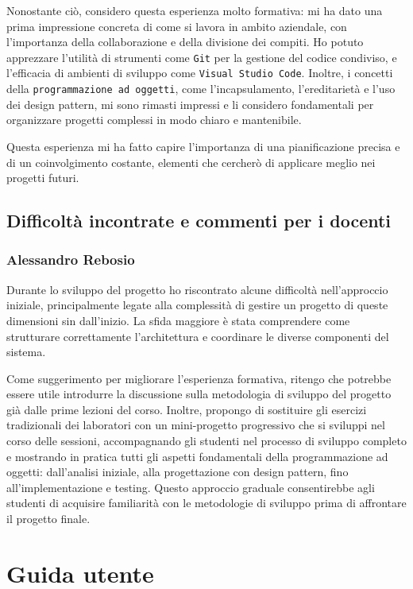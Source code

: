 \documentclass[a4paper,12pt]{report}
\begin{document}
Nonostante ciò, considero questa esperienza molto formativa: mi ha dato una prima impressione concreta di come si lavora in ambito aziendale, con l'importanza della
collaborazione e della divisione dei compiti. Ho potuto apprezzare l'utilità di strumenti come \texttt{Git} per la gestione del codice condiviso, e l'efficacia di ambienti di
sviluppo come \texttt{Visual Studio Code}. Inoltre, i concetti della \texttt{programmazione ad oggetti}, come l'incapsulamento, l'ereditarietà e l'uso dei design pattern, mi sono
rimasti impressi e li considero fondamentali per organizzare progetti complessi in modo chiaro e mantenibile.

Questa esperienza mi ha fatto capire l'importanza di una pianificazione precisa e di un coinvolgimento costante, elementi che cercherò di applicare meglio nei progetti futuri.

\newpage
\section{Difficoltà incontrate e commenti per i docenti}
\subsection{Alessandro Rebosio}
Durante lo sviluppo del progetto ho riscontrato alcune difficoltà nell'approccio iniziale, principalmente legate alla complessità di gestire un progetto di queste
dimensioni sin dall'inizio. La sfida maggiore è stata comprendere come strutturare correttamente l'architettura e coordinare le diverse componenti del sistema.

Come suggerimento per migliorare l'esperienza formativa, ritengo che potrebbe essere utile introdurre la discussione sulla metodologia di sviluppo del progetto già dalle prime
lezioni del corso. Inoltre, propongo di sostituire gli esercizi tradizionali dei laboratori con un mini-progetto progressivo che si sviluppi nel corso delle sessioni,
accompagnando gli studenti nel processo di sviluppo completo e mostrando in pratica tutti gli aspetti fondamentali della programmazione ad oggetti: dall'analisi iniziale,
alla progettazione con design pattern, fino all'implementazione e testing. Questo approccio graduale consentirebbe agli studenti di acquisire familiarità con le metodologie di
sviluppo prima di affrontare il progetto finale.


\appendix
\chapter{Guida utente}
\end{document}
